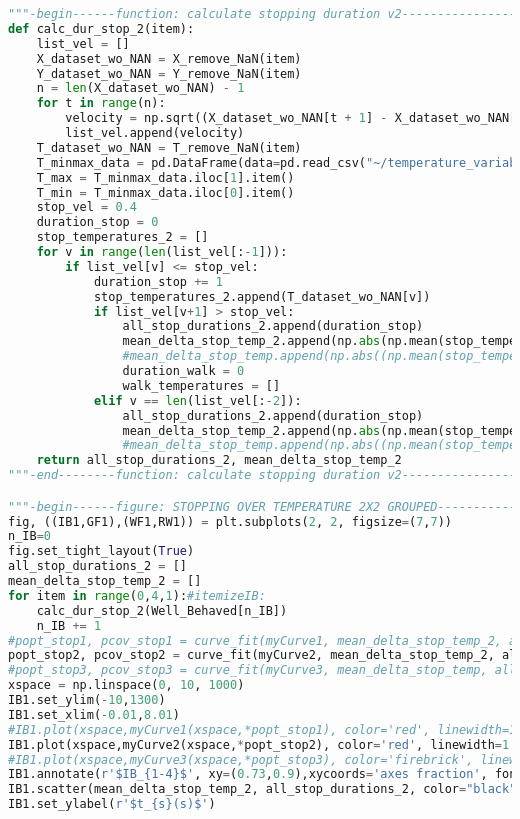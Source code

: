\begin{lstlisting}[language=Python, basicstyle=\tiny, frame=single, keywordstyle=\color{teal}, commentstyle=\color{olive}, stringstyle=\color{red}]
"""-begin------function: calculate stopping duration v2----------------------"""
def calc_dur_stop_2(item):
    list_vel = []
    X_dataset_wo_NAN = X_remove_NaN(item)
    Y_dataset_wo_NAN = Y_remove_NaN(item)
    n = len(X_dataset_wo_NAN) - 1
    for t in range(n):
        velocity = np.sqrt((X_dataset_wo_NAN[t + 1] - X_dataset_wo_NAN[t]) ** 2 + (Y_dataset_wo_NAN[t + 1] - Y_dataset_wo_NAN[t]) ** 2)
        list_vel.append(velocity)
    T_dataset_wo_NAN = T_remove_NaN(item)
    T_minmax_data = pd.DataFrame(data=pd.read_csv("~/temperature_variables.csv"), columns=[item])
    T_max = T_minmax_data.iloc[1].item()
    T_min = T_minmax_data.iloc[0].item()
    stop_vel = 0.4
    duration_stop = 0
    stop_temperatures_2 = []
    for v in range(len(list_vel[:-1])):
        if list_vel[v] <= stop_vel:
            duration_stop += 1
            stop_temperatures_2.append(T_dataset_wo_NAN[v])
            if list_vel[v+1] > stop_vel:
                all_stop_durations_2.append(duration_stop)
                mean_delta_stop_temp_2.append(np.abs(np.mean(stop_temperatures_2) - T_max))
                #mean_delta_stop_temp.append(np.abs((np.mean(stop_temperatures) - T_max))/np.abs(T_max - T_min))
                duration_walk = 0
                walk_temperatures = []
            elif v == len(list_vel[:-2]):
                all_stop_durations_2.append(duration_stop)
                mean_delta_stop_temp_2.append(np.abs(np.mean(stop_temperatures_2) - T_max))
                #mean_delta_stop_temp.append(np.abs((np.mean(stop_temperatures) - T_max))/np.abs(T_max - T_min))
    return all_stop_durations_2, mean_delta_stop_temp_2
"""-end--------function: calculate stopping duration v2----------------------"""

"""-begin------figure: STOPPING OVER TEMPERATURE 2X2 GROUPED-----------------"""
fig, ((IB1,GF1),(WF1,RW1)) = plt.subplots(2, 2, figsize=(7,7))
n_IB=0
fig.set_tight_layout(True)
all_stop_durations_2 = []
mean_delta_stop_temp_2 = []
for item in range(0,4,1):#itemizeIB:
    calc_dur_stop_2(Well_Behaved[n_IB])
    n_IB += 1
#popt_stop1, pcov_stop1 = curve_fit(myCurve1, mean_delta_stop_temp_2, all_stop_durations_2, maxfev = 200000, p0=(0,0))
popt_stop2, pcov_stop2 = curve_fit(myCurve2, mean_delta_stop_temp_2, all_stop_durations_2, maxfev = 200000, p0=(0,0))
#popt_stop3, pcov_stop3 = curve_fit(myCurve3, mean_delta_stop_temp, all_stop_durations, maxfev = 200000, p0=(0,0,0))
xspace = np.linspace(0, 10, 1000)
IB1.set_ylim(-10,1300)
IB1.set_xlim(-0.01,8.01)
#IB1.plot(xspace,myCurve1(xspace,*popt_stop1), color='red', linewidth=1.1, linestyle='dashed', label=r'$\tau/(1+(\beta*\Delta T))$')
IB1.plot(xspace,myCurve2(xspace,*popt_stop2), color='red', linewidth=1.1, linestyle='dashdot', label=r'$\tau*\exp(-\beta*\Delta T) $')
#IB1.plot(xspace,myCurve3(xspace,*popt_stop3), color='firebrick', linewidth=1.1, label=r'$\tau*(\beta*\Delta T)**\gamma$')
IB1.annotate(r'$IB_{1-4}$', xy=(0.73,0.9),xycoords='axes fraction', fontsize=12)
IB1.scatter(mean_delta_stop_temp_2, all_stop_durations_2, color="black", alpha=0.3)
IB1.set_ylabel(r'$t_{s}(s)$')


\end{lstlisting}
